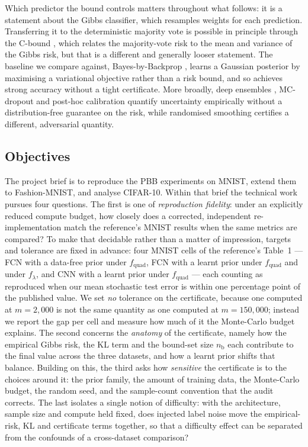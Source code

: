 Which predictor the bound controls matters throughout what follows: it is a
statement about the Gibbs classifier, which resamples weights for each
prediction. Transferring it to the deterministic majority vote is possible in
principle through the C-bound \parencite{lacasse2006,germain2015}, which relates
the majority-vote risk to the mean and variance of the Gibbs risk, but that is a
different and generally looser statement. The baseline we compare against,
Bayes-by-Backprop \parencite{blundell2015}, learns a Gaussian posterior by
maximising a variational objective rather than a risk bound, and so achieves
strong accuracy without a tight certificate. More broadly, deep ensembles
\parencite{lakshminarayanan2017}, MC-dropout \parencite{gal2016} and post-hoc
calibration \parencite{guo2017} quantify uncertainty empirically without a
distribution-free guarantee on the risk, while randomised smoothing
\parencite{cohen2019} certifies a different, adversarial quantity.

\subsection{Objectives}\label{sec:rqs}

The project brief is to reproduce the PBB experiments on MNIST, extend them to
Fashion-MNIST, and analyse CIFAR-10. Within that brief the technical work pursues
four questions. The first is one of \emph{reproduction fidelity}: under an
explicitly reduced compute budget, how closely does a corrected, independent
re-implementation match the reference's MNIST results when the same metrics are
compared? To make that decidable rather than a matter of impression, targets and
tolerance are fixed in advance: four MNIST cells of the reference's Table~1 --- FCN
with a data-free prior under $f_{\text{quad}}$, FCN with a learnt prior under
$f_{\text{quad}}$ and under $f_{\lambda}$, and CNN with a learnt prior under
$f_{\text{quad}}$ --- each counting as reproduced when our mean stochastic test
error is within one percentage
point of the published value. We set \emph{no} tolerance on the certificate,
because one computed at $m=2{,}000$ is not the same quantity as one computed at
$m=150{,}000$; instead we report the gap per cell and measure how much of it the
Monte-Carlo budget explains. The second concerns the \emph{anatomy} of the certificate, namely how
the empirical Gibbs risk, the KL term and the bound-set size $n_{\mathrm b}$ each
contribute to the final value across the three datasets, and how a learnt prior
shifts that balance. Building on this, the third asks how \emph{sensitive} the
certificate is to the choices around it: the prior family, the amount of training
data, the Monte-Carlo budget, the random seed, and the sample-count convention
that the audit corrects. The last isolates a single notion of difficulty: with the
architecture, sample size and compute held fixed, does injected label noise move
the empirical-risk, KL and certificate terms together, so that a difficulty effect
can be separated from the confounds of a cross-dataset comparison?

